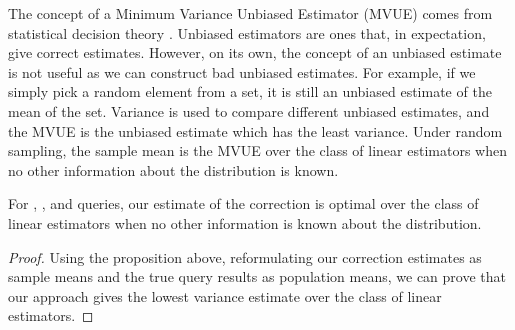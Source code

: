 The concept of a Minimum Variance Unbiased Estimator (MVUE) comes from statistical decision theory \cite{cox1979theoretical}.
Unbiased estimators are ones that, in expectation, give correct estimates.
However, on its own, the concept of an unbiased estimate is not useful as we can construct bad unbiased estimates.
For example, if we simply pick a random element from a set, it is still an unbiased estimate of the mean of the set.
Variance is used to compare different unbiased estimates, and the MVUE is the unbiased estimate which has the least variance.
Under random sampling, the sample mean is the MVUE over the class of linear estimators when no other information about the distribution is known.
\begin{theorem}
For \sumfunc, \countfunc, and \avgfunc queries, our estimate of the correction is optimal over the class of linear estimators when no other information is known about the distribution. 
\end{theorem}
\begin{proof}
Using the proposition above, reformulating our correction estimates as sample means and the true query results as population means, we can prove that our approach gives the lowest variance estimate over the class of linear estimators.
\end{proof}